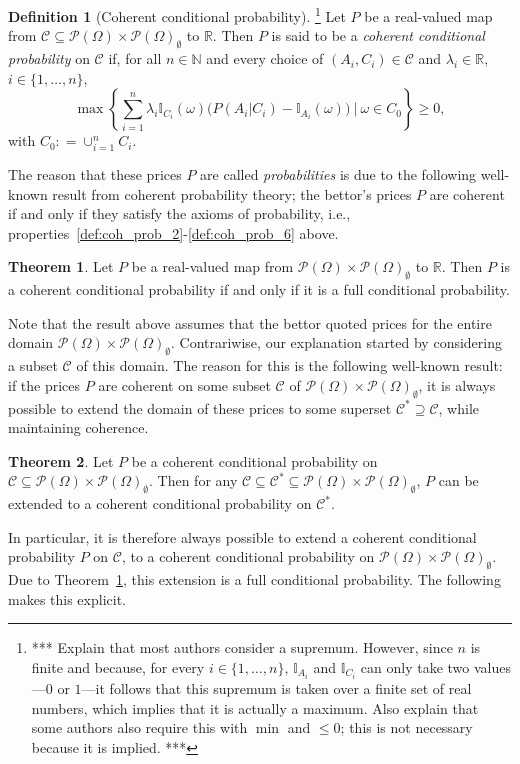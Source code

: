 \documentclass[10pt,a4paper]{paper}
\theoremstyle{definition}
\newtheorem{theorem}{Theorem}
\newtheorem{definition}{Definition}
\newcommand{\reals}{\mathbb{R}}
\newcommand{\paths}{\Omega}
\newcommand{\power}{\mathcal{P}(\paths)}
\newcommand{\nonemptypower}{\power_{\emptyset}}
\newcommand{\ind}[1]{\mathbb{I}_{#1}}
\newcommand{\coloneqq}{:\!=}
\begin{document}
\begin{definition}[Coherent conditional probability]\label{def:coherence}\footnote{*** Explain that most authors consider a supremum. However, since $n$ is finite and because, for every $i\in\{1,\dots,n\}$, $\ind{A_i}$ and $\ind{C_i}$ can only take two values---$0$ or $1$---it follows that this supremum is taken over a finite set of real numbers, which implies that it is actually a maximum. Also explain that some authors also require this with $\min$ and $\leq0$; this is not necessary because it is implied. ***}
Let $P$ be a real-valued map from $\mathcal{C}\subseteq\power\times\nonemptypower$ to $\reals$. Then $P$ is said to be a \emph{coherent conditional probability} on $\mathcal{C}$ if, for all $n\in\mathbb{N}$ and every choice of $(A_i,C_i)\in\mathcal{C}$ and $\lambda_i\in\reals$, $i\in\{1,\dots,n\}$,
\begin{equation*}
\max\left\{\sum_{i=1}^n\lambda_i\ind{C_i}(\omega)\bigl(P(A_i\vert C_i)-\ind{A_i}(\omega)\bigr)~\Bigg\vert~\omega\in C_0\right\}\geq0,
\end{equation*}
with $C_0\coloneqq\cup_{i=1}^nC_i$.
\end{definition}

The reason that these prices $P$ are called \emph{probabilities} is due to the following well-known result from coherent probability theory; the bettor's prices $P$ are coherent if and only if they satisfy the axioms of probability, i.e., properties~\ref{def:coh_prob_2}-\ref{def:coh_prob_6} above.

\begin{theorem}{\cite[Theorem 3]{regazzini1985finitely}}\label{theo:fullcoherent}
Let $P$ be a real-valued map from $\power\times\nonemptypower$ to $\reals$. Then $P$ is a coherent conditional probability if and only if it is a full conditional probability.
\end{theorem}
Note that the result above assumes that the bettor quoted prices for the entire domain $\power\times\nonemptypower$. Contrariwise, our explanation started by considering a subset $\mathcal{C}$ of this domain. The reason for this is the following well-known result: if the prices $P$ are coherent on some subset $\mathcal{C}$ of $\power\times\nonemptypower$, it is always possible to extend the domain of these prices to some superset $\mathcal{C}^*\supseteq \mathcal{C}$, while maintaining coherence.

\begin{theorem}{\cite[Theorem 4]{regazzini1985finitely}}\label{theo:largerdomain}
Let $P$ be a coherent conditional probability on $\mathcal{C}\subseteq\power\times\nonemptypower$. Then for any $\mathcal{C}\subseteq\mathcal{C}^*\subseteq\power\times\nonemptypower$, $P$ can be extended to a coherent conditional probability on $\mathcal{C}^*$.
\end{theorem}
In particular, it is therefore always possible to extend a coherent conditional probability $P$ on $\mathcal{C}$, to a coherent conditional probability on $\power\times\nonemptypower$. Due to Theorem~\ref{theo:fullcoherent}, this extension is a full conditional probability. The following makes this explicit.
\end{document}

